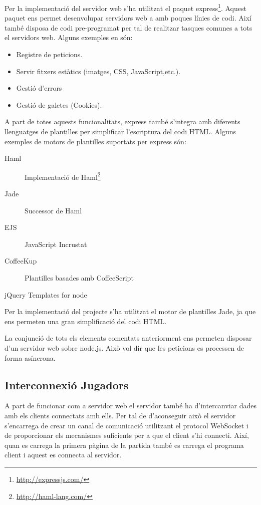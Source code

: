 Per la implementació del servidor web s'ha utilitzat el paquet express\footnote{\url{http://expressjs.com/}}. Aquest paquet ens permet desenvolupar servidors web a amb poques línies de codi. Així també disposa de codi pre-programat per tal de realitzar tasques comunes a tots el servidors web. Alguns exemples en són:

\begin{itemize}
\item{Registre de peticions.}
\item{Servir fitxers estàtics (imatges, CSS, JavaScript,etc.).}
\item{Gestió d'errors}
\item{Gestió de galetes (Cookies).}
\end{itemize}

A part de totes aquests funcionalitats, express també s'integra amb diferents llenguatges de plantilles per simplificar l'escriptura del codi HTML. Alguns exemples de motors de plantilles suportats per express són: 

\begin{description}
\item[Haml] {Implementació de Haml\footnote{\url{http://haml-lang.com/}} }
\item[Jade] {Successor de Haml}
\item[EJS] {JavaScript Incrustat}
\item[CoffeeKup] {Plantilles basades amb CoffeeScript}
\item[jQuery Templates for node]
\end{description}

Per la implementació del projecte s'ha utilitzat el motor de plantilles Jade, ja que ens permeten una gran simplificació del codi HTML.

La conjunció de tots els elements comentats anteriorment ens permeten disposar d'un servidor web sobre node.js. Això vol dir que les peticions es processen de forma asíncrona. 

\subsection{Interconnexió Jugadors}
\label{sec:interconnexio-jugadors}
A part de funcionar com a servidor web el servidor també ha d'intercanviar dades amb els clients connectats amb ells. Per tal de d'aconseguir això el servidor s'encarrega de crear un canal de comunicació utilitzant el protocol WebSocket i de proporcionar els mecanismes suficients per a que el client s'hi connecti. Així, quan es carrega la primera pàgina de la partida també es carrega el programa client i aquest es connecta al servidor. 

